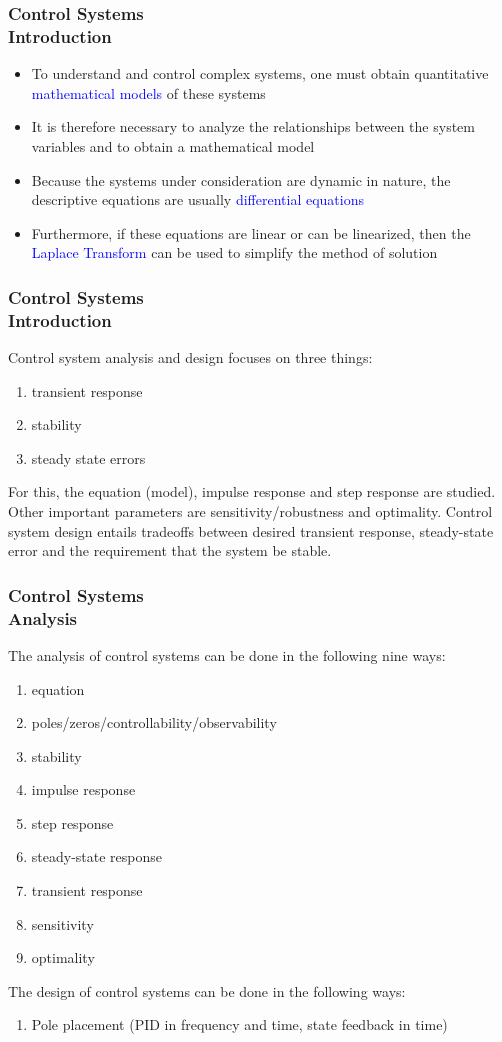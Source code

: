 \documentclass[hyperref={pdfpagelabels=true}]{beamer}
\begin{document}
\begin{frame}
\frametitle{Control Systems \\ {\large Introduction}} 
\begin{itemize}
\item To understand and control complex systems, one
must obtain quantitative \textcolor{blue}{mathematical models} of
these systems
\item It is therefore necessary to analyze the relationships
between the system variables and to obtain a
mathematical model
\item Because the systems under consideration are
dynamic in nature, the descriptive equations are
usually  \textcolor{blue}{differential equations}
\item Furthermore, if these equations are linear or can be
linearized, then the \textcolor{blue}{Laplace Transform} can be
used to simplify the method of solution
\end{itemize}
\end{frame}

\begin{frame}
\frametitle{Control Systems \\ {\large Introduction}} 
Control system analysis and design focuses on three
things:
\begin{enumerate}
\item transient response
\item stability
\item steady state errors
\end{enumerate}
For this, the equation (model), impulse response and
step response are studied. Other important parameters
are sensitivity/robustness and optimality.
Control system design entails tradeoffs between desired
transient response, steady-state error and the
requirement that the system be stable.
\label{contents}
\end{frame}

\begin{frame}
\frametitle{Control Systems \\ {\large Analysis}} 
The analysis of control systems can be done in the following nine ways:
\begin{enumerate}
\item equation
\item poles/zeros/controllability/observability
\item stability
\item impulse response
\item step response
\item steady-state response
\item transient response
\item sensitivity
\item optimality
\end{enumerate}
The design of control systems can be done in the following ways:
\begin{enumerate}
\item Pole placement (PID in frequency and time, state feedback in
time)
\end{enumerate}
\hyperlink{contents}{}
\end{frame}
\end{document}
